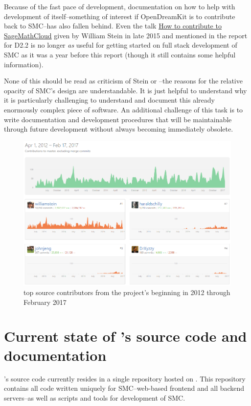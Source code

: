 \documentclass{deliverablereport}
\begin{document}
Because of the fast pace of development, documentation on how to help with
development of \SMC itself--something of interest if OpenDreamKit is to
contribute back to SMC--has also fallen behind.  Even the talk
\href{https://youtu.be/GOuy07Kift4}{How to contribute to SageMathCloud} given
by William Stein in late 2015 and mentioned in the report for D2.2
is no longer \emph{as} useful for getting started on full stack development
of SMC as it was a year before this report (though it still contains some
helpful information).

None of this should be read as criticism of Stein or \SMC--the reasons for the
relative opacity of SMC's design are understandable.  It is just helpful to
understand why it is particularly challenging to understand and document this
already enormously complex piece of software.  An additional challenge of this
task is to write documentation and development procedures that will be
maintainable through future development without always becoming immediately
obsolete.

\begin{figure}
\includegraphics[width=\textwidth]{images/smc-contributions-2017-02-17.png}
\caption{top \SMC source contributors from the project's beginning in 2012 through February 2017}
\end{figure}

\section{Current state of \SMC's source code and documentation}

\SMC's source code currently resides in a single \git repository hosted on
\GitHub.  This repository contains all code written uniquely for SMC--web-based
frontend and all backend servers--as well as scripts and tools for development
of SMC.
\end{document}
